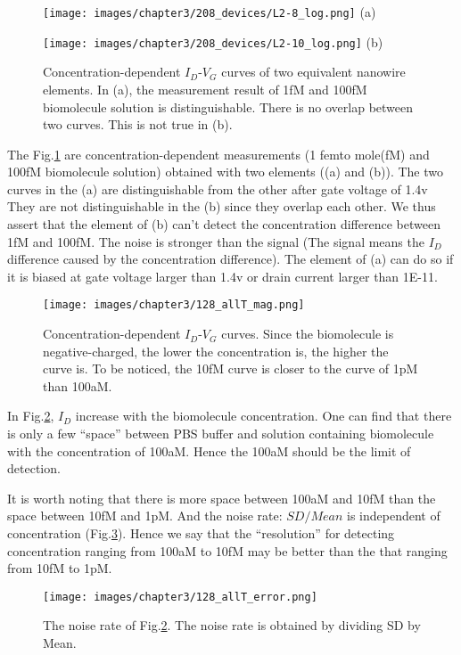 \begin{figure}[!htbp]
    \centering
    \begin{minipage}[t]{0.4\textwidth}
        \centering
        \texttt{[image: images/chapter3/208\_devices/L2-8\_log.png]}
        (a)
    \end{minipage}
    \hfill
    \begin{minipage}[t]{0.4\textwidth}
        \centering
        \texttt{[image: images/chapter3/208\_devices/L2-10\_log.png]}
        (b)
    \end{minipage}
    \caption{Concentration-dependent $I_D$-$V_G$ curves of two equivalent nanowire elements.
    In (a), the measurement result of 1fM and 100fM biomolecule solution is distinguishable. There is no overlap between two curves. This is not true in (b).}
    \label{fig:SD_sucandfail}
\end{figure}

The Fig.\ref{fig:SD_sucandfail} are concentration-dependent measurements (1 femto mole(fM) and 100fM biomolecule solution) obtained with two elements ((a) and (b)).
The two curves in the (a) are distinguishable from the other after gate voltage of 1.4v
They are not distinguishable in the (b) since they overlap each other.
We thus assert that the element of (b) can't detect the concentration difference between 1fM and 100fM.
The noise is stronger than the signal (The signal means the $I_D$ difference caused by the concentration difference).
The element of (a) can do so if it is biased at gate voltage larger than 1.4v or drain current larger than 1E-11.

\begin{figure}[!htbp]
        \texttt{[image: images/chapter3/128\_allT\_mag.png]}
    \caption{Concentration-dependent $I_D$-$V_G$ curves.
    Since the biomolecule is negative-charged, the lower the concentration is, the higher the curve is.
    To be noticed, the 10fM curve is closer to the curve of 1pM than 100aM.
     }
    \label{fig:SD_allT}
\end{figure}

In Fig.\ref{fig:SD_allT}, $I_D$ increase with the biomolecule concentration.
One can find that there is only a few ``space'' between PBS buffer and solution containing biomolecule with the concentration of 100aM.
Hence the 100aM should be the limit of detection.

It is worth noting that there is more space between 100aM and 10fM than the space between 10fM and 1pM.
And the noise rate: ${SD} / {Mean}$ is independent of concentration (Fig.\ref{fig:SD_allT2}).
Hence we say that the ``resolution'' for detecting concentration ranging from 100aM to 10fM may be better than the that ranging from 10fM to 1pM.
\begin{figure}[!htbp]
        \texttt{[image: images/chapter3/128\_allT\_error.png]}
    \caption{The noise rate of Fig.\ref{fig:SD_allT}. The noise rate is obtained by dividing SD by Mean.}
    \label{fig:SD_allT2}
\end{figure}

